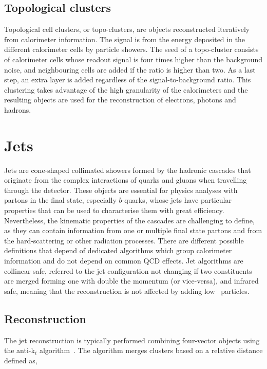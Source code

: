 \subsection{Topological clusters}

Topological cell clusters, or topo-clusters, are objects reconstructed iteratively from calorimeter information. The signal is from the energy deposited in the different calorimeter cells by particle showers. The seed of a topo-cluster consists of calorimeter cells whose readout signal is four times higher than the background noise, and neighbouring cells are added if the ratio is higher than two. As a last step, an extra layer is added regardless of the signal-to-background ratio. This clustering takes advantage of the high granularity of the calorimeters and the resulting objects are used for the reconstruction of electrons, photons and hadrons.

\section{Jets}

Jets are cone-shaped collimated showers formed by the hadronic cascades that originate from the complex interactions of quarks and gluons when travelling through the detector. These objects are essential for physics analyses with partons in the final state, especially $b$-quarks, whose jets have particular properties that can be used to characterise them with great efficiency. Nevertheless, the kinematic properties of the cascades are challenging to define, as they can contain information from one or multiple final state partons and from the hard-scattering or other radiation processes. There are different possible definitions that depend of dedicated algorithms which group calorimeter information and do not depend on common \acrshort{QCD} effects. Jet algorithms are collinear safe, referred to the jet configuration not changing if two constituents are merged forming one with double the momentum (or vice-versa), and infrared safe, meaning that the reconstruction is not affected by adding low \pT\ particles.

\subsection{Reconstruction}

The jet reconstruction is typically performed combining four-vector objects using the anti-k$_t$ algorithm~\cite{Cacciari_2008}. The algorithm merges clusters based on a relative distance defined as,


